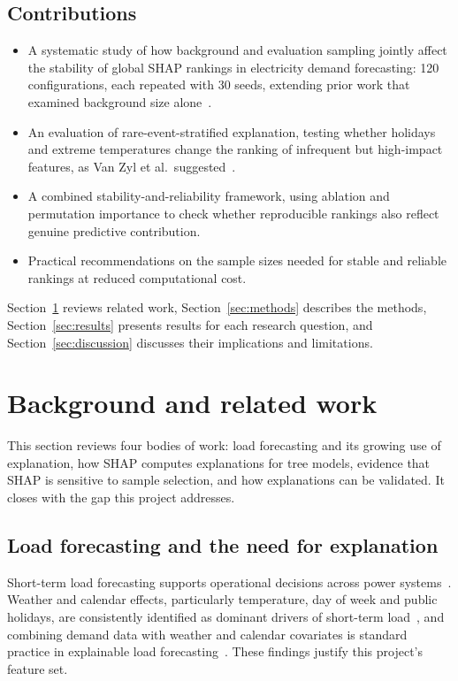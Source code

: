 \documentclass[11pt,a4paper]{article}
\begin{document}
\subsection{Contributions}
\begin{itemize}
  \item A systematic study of how background and evaluation sampling jointly affect the stability of global SHAP rankings in electricity demand forecasting: 120 configurations, each repeated with 30 seeds, extending prior work that examined background size alone~\cite{yuan2023}.
  \item An evaluation of rare-event-stratified explanation, testing whether holidays and extreme temperatures change the ranking of infrequent but high-impact features, as Van Zyl et al.\ suggested~\cite{vanzyl2024}.
  \item A combined stability-and-reliability framework, using ablation and permutation importance to check whether reproducible rankings also reflect genuine predictive contribution.
  \item Practical recommendations on the sample sizes needed for stable and reliable rankings at reduced computational cost.
\end{itemize}

Section~\ref{sec:background} reviews related work, Section~\ref{sec:methods} describes the methods, Section~\ref{sec:results} presents results for each research question, and Section~\ref{sec:discussion} discusses their implications and limitations.

\section{Background and related work}\label{sec:background}

This section reviews four bodies of work: load forecasting and its growing use of explanation, how SHAP computes explanations for tree models, evidence that SHAP is sensitive to sample selection, and how explanations can be validated. It closes with the gap this project addresses.

\subsection{Load forecasting and the need for explanation}

Short-term load forecasting supports operational decisions across power systems~\cite{pinheiro2023}. Weather and calendar effects, particularly temperature, day of week and public holidays, are consistently identified as dominant drivers of short-term load~\cite{hong2016}, and combining demand data with weather and calendar covariates is standard practice in explainable load forecasting~\cite{machlev2022}. These findings justify this project's feature set.
\end{document}
